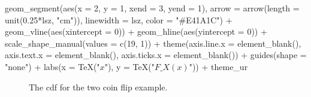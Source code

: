 \documentclass[
  a4paper,
  oneside]{book}
\newenvironment{Shaded}{\begin{snugshade}}{\end{snugshade}}
\newcommand{\AttributeTok}[1]{\textcolor[rgb]{0.40,0.45,0.13}{#1}}
\newcommand{\DecValTok}[1]{\textcolor[rgb]{0.68,0.00,0.00}{#1}}
\newcommand{\FloatTok}[1]{\textcolor[rgb]{0.68,0.00,0.00}{#1}}
\newcommand{\FunctionTok}[1]{\textcolor[rgb]{0.28,0.35,0.67}{#1}}
\newcommand{\NormalTok}[1]{\textcolor[rgb]{0.00,0.23,0.31}{#1}}
\newcommand{\SpecialCharTok}[1]{\textcolor[rgb]{0.37,0.37,0.37}{#1}}
\newcommand{\StringTok}[1]{\textcolor[rgb]{0.13,0.47,0.30}{#1}}
\theoremstyle{definition}
\theoremstyle{definition}
\theoremstyle{definition}
\theoremstyle{plain}
\theoremstyle{remark}
\begin{document}
\begin{Shaded}
\begin{Highlighting}[]
  \FunctionTok{geom\_segment}\NormalTok{(}\FunctionTok{aes}\NormalTok{(}\AttributeTok{x =} \DecValTok{2}\NormalTok{, }\AttributeTok{y =} \DecValTok{1}\NormalTok{, }\AttributeTok{xend =} \DecValTok{3}\NormalTok{, }\AttributeTok{yend =} \DecValTok{1}\NormalTok{), }\AttributeTok{arrow =} \FunctionTok{arrow}\NormalTok{(}\AttributeTok{length =} \FunctionTok{unit}\NormalTok{(}\FloatTok{0.25}\SpecialCharTok{*}\NormalTok{lsz, }\StringTok{"cm"}\NormalTok{)), }\AttributeTok{linewidth =}\NormalTok{ lsz, }\AttributeTok{color =} \StringTok{"\#E41A1C"}\NormalTok{) }\SpecialCharTok{+}
  \FunctionTok{geom\_vline}\NormalTok{(}\FunctionTok{aes}\NormalTok{(}\AttributeTok{xintercept =} \DecValTok{0}\NormalTok{)) }\SpecialCharTok{+}
  \FunctionTok{geom\_hline}\NormalTok{(}\FunctionTok{aes}\NormalTok{(}\AttributeTok{yintercept =} \DecValTok{0}\NormalTok{)) }\SpecialCharTok{+}
 \FunctionTok{scale\_shape\_manual}\NormalTok{(}\AttributeTok{values =} \FunctionTok{c}\NormalTok{(}\DecValTok{19}\NormalTok{, }\DecValTok{1}\NormalTok{)) }\SpecialCharTok{+}
  \FunctionTok{theme}\NormalTok{(}\AttributeTok{axis.line.x =} \FunctionTok{element\_blank}\NormalTok{(), }
        \AttributeTok{axis.text.x =} \FunctionTok{element\_blank}\NormalTok{(),}
        \AttributeTok{axis.ticks.x =} \FunctionTok{element\_blank}\NormalTok{()) }\SpecialCharTok{+}
 \FunctionTok{guides}\NormalTok{(}\AttributeTok{shape =} \StringTok{"none"}\NormalTok{) }\SpecialCharTok{+} 
 \FunctionTok{labs}\NormalTok{(}\AttributeTok{x =} \FunctionTok{TeX}\NormalTok{(}\StringTok{"$x$"}\NormalTok{), }\AttributeTok{y =} \FunctionTok{TeX}\NormalTok{(}\StringTok{"$F\_X(x)$"}\NormalTok{)) }\SpecialCharTok{+}\NormalTok{ theme\_ur}
\end{Highlighting}
\end{Shaded}

\begin{figure}[H]


\caption{\label{fig-eg-cdf-coin-flip-plot}The cdf for the two coin flip
example.}

\end{figure}%
\end{document}
